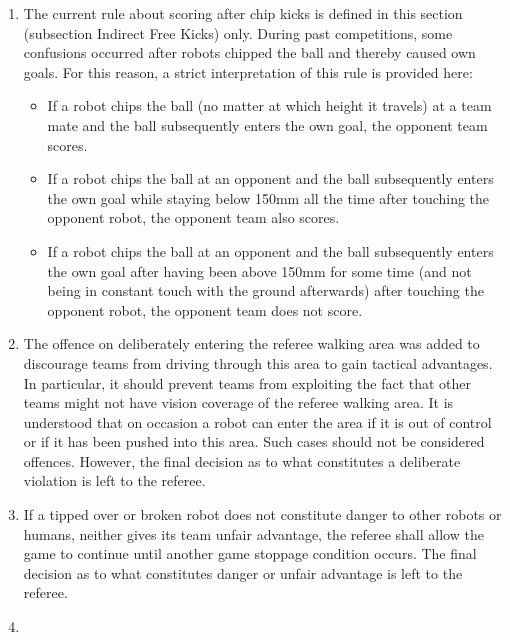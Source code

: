 \begin{enumerate}
\item
The current rule about scoring after chip kicks is defined in this section (subsection Indirect Free Kicks) only.
During past competitions, some confusions occurred after robots chipped the ball and thereby caused own goals.
For this reason, a strict interpretation of this rule is provided here:
\begin{itemize}
\item If a robot chips the ball (no matter at which height it travels) at a team mate and the ball subsequently enters the own goal, the opponent team scores.
\item If a robot chips the ball at an opponent and the ball subsequently enters the own goal while staying below 150mm all the time after touching the opponent robot, the opponent team also scores.
\item If a robot chips the ball at an opponent and the ball subsequently enters the own goal after having been above 150mm for some time (and not being in constant touch with the ground afterwards) after touching the opponent robot, the opponent team does not score.
\end{itemize}

\item
The offence on deliberately entering the referee walking area was added to discourage teams from driving through this area to gain tactical advantages.
In particular, it should prevent teams from exploiting the fact that other teams might not have vision coverage of the referee walking area.
It is understood that on occasion a robot can enter the area if it is out of control or if it has been pushed into this area.
Such cases should not be considered offences.
However, the final decision as to what constitutes a deliberate violation is left to the referee.

\item
If a tipped over or broken robot does not constitute danger to other robots or humans, neither gives its team unfair advantage, the referee shall allow the game to continue until another game stoppage condition occurs.
The final decision as to what constitutes danger or unfair advantage is left to the referee.

\item
{}
\end{enumerate}
